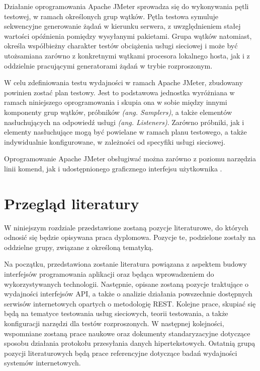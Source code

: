 Działanie oprogramowania Apache JMeter sprowadza się do wykonywania pętli testowej, w ramach określonych grup wątków. Pętla testowa symuluje sekwencyjne generowanie żądań w kierunku serwera, z uwzględnieniem stałej wartości opóźnienia pomiędzy wysyłanymi pakietami. Grupa wątków natomiast, określa współbieżny charakter testów obciążenia usługi sieciowej i może być utożsamiana zarówno z konkretnymi wątkami procesora lokalnego hosta, jak i z oddzielnie pracującymi generatorami żądań w trybie rozproszonym.

W celu zdefiniowania testu wydajności w ramach Apache JMeter, zbudowany powinien zostać plan testowy. Jest to podstawowa jednostka wyróżniana w ramach niniejszego oprogramowania i skupia ona w sobie między innymi komponenty grup wątków, próbników \textit{(ang. Samplers)}, a także elementów nasłuchujących na odpowiedź usługi \textit{(ang. Listeners)}. Zarówno próbniki, jak i elementy nasłuchujące mogą być powielane w ramach planu testowego, a także indywidualnie konfigurowane, w zależności od specyfiki usługi sieciowej.

Oprogramowanie Apache JMeter obsługiwać można zarówno z poziomu narzędzia linii komend, jak i udostępnionego graficznego interfejsu użytkownika \cite{halili2008apache}. 
\section{Przegląd literatury}
W niniejszym rozdziale przedstawione zostaną pozycje literaturowe, do których odnosić się będzie opisywana praca dyplomowa. Pozycje te, podzielone zostały na oddzielne grupy, związane z określoną tematyką.

Na początku, przedstawiona zostanie literatura powiązana z aspektem budowy interfejsów programowania aplikacji oraz będąca wprowadzeniem do wykorzystywanych technologii. Następnie, opisane zostaną pozycje traktujące o wydajności interfejsów API, a także o analizie działania powszechnie dostępnych serwisów internetowych opartych o metodologię REST. Kolejne prace, skupiać się będą na tematyce testowania usług sieciowych, teorii testowania, a także konfiguracji narzędzi dla testów rozproszonych. W następnej kolejności, wspomniane zostaną prace naukowe oraz dokumenty standaryzacyjne dotyczące sposobu działania protokołu przesyłania danych hipertekstowych. Ostatnią grupą pozycji literaturowych będą prace referencyjne dotyczące badań wydajności systemów internetowych.

